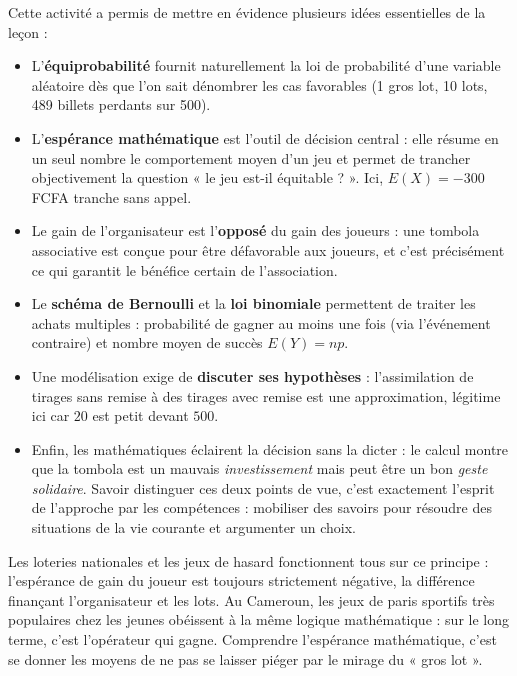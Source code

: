 \documentclass[11pt]{article}
\newcounter{popsec}
\newcounter{popsub}
\newcommand{\courssub}[1]{%
  \stepcounter{popsub}%
  \par\vspace{9pt}\noindent{\popxbold\fontsize{11.5}{13}\selectfont\color{popink}{\color{poporange}\thepopsec.\thepopsub}\hspace{6pt}#1}\par\nopagebreak\vspace{4pt}
}
\begin{document}
\courssub{Bilan de l'activité}

Cette activité a permis de mettre en évidence plusieurs idées essentielles de la leçon :

\begin{itemize}
\item L'\textbf{équiprobabilité} fournit naturellement la loi de probabilité d'une variable aléatoire dès que l'on sait dénombrer les cas favorables (1 gros lot, 10 lots, 489 billets perdants sur 500).
\item L'\textbf{espérance mathématique} est l'outil de décision central : elle résume en un seul nombre le comportement moyen d'un jeu et permet de trancher objectivement la question « le jeu est-il équitable ? ». Ici, $E(X) = -300$ FCFA tranche sans appel.
\item Le gain de l'organisateur est l'\textbf{opposé} du gain des joueurs : une tombola associative est conçue pour être défavorable aux joueurs, et c'est précisément ce qui garantit le bénéfice certain de l'association.
\item Le \textbf{schéma de Bernoulli} et la \textbf{loi binomiale} permettent de traiter les achats multiples : probabilité de gagner au moins une fois (via l'événement contraire) et nombre moyen de succès $E(Y) = np$.
\item Une modélisation exige de \textbf{discuter ses hypothèses} : l'assimilation de tirages sans remise à des tirages avec remise est une approximation, légitime ici car $20$ est petit devant $500$.
\item Enfin, les mathématiques éclairent la décision sans la dicter : le calcul montre que la tombola est un mauvais \emph{investissement} mais peut être un bon \emph{geste solidaire}. Savoir distinguer ces deux points de vue, c'est exactement l'esprit de l'approche par les compétences : mobiliser des savoirs pour résoudre des situations de la vie courante et argumenter un choix.
\end{itemize}

\begin{savaistu}
Les loteries nationales et les jeux de hasard fonctionnent tous sur ce principe : l'espérance de gain du joueur est toujours strictement négative, la différence finançant l'organisateur et les lots. Au Cameroun, les jeux de paris sportifs très populaires chez les jeunes obéissent à la même logique mathématique : sur le long terme, c'est l'opérateur qui gagne. Comprendre l'espérance mathématique, c'est se donner les moyens de ne pas se laisser piéger par le mirage du « gros lot ».
\end{savaistu}
\end{document}
